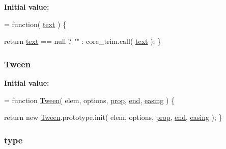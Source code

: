 {\bfseries Initial value\-:}
\begin{DoxyCode}
= \textcolor{keyword}{function}( \hyperlink{jquery-1_810_82-vsdoc_8js_aa5b77da29631a344064bb3d20c8702de}{text} ) \{


            \textcolor{keywordflow}{return} \hyperlink{jquery-1_810_82-vsdoc_8js_aa5b77da29631a344064bb3d20c8702de}{text} == null ?
                \textcolor{stringliteral}{""} :
                core\_trim.call( \hyperlink{jquery-1_810_82-vsdoc_8js_aa5b77da29631a344064bb3d20c8702de}{text} );
        \}
\end{DoxyCode}
\hypertarget{jquery-1_810_82-vsdoc_8js_a91e55267cc469e865a6a7c6cfc51c7b1}{
\subsubsection[{Tween}]{ Tween}}\label{jquery-1_810_82-vsdoc_8js_a91e55267cc469e865a6a7c6cfc51c7b1}
{\bfseries Initial value\-:}
\begin{DoxyCode}
= \textcolor{keyword}{function} \hyperlink{jquery-1_810_82-vsdoc_8js_a91e55267cc469e865a6a7c6cfc51c7b1}{Tween}( elem, options, \hyperlink{jquery-1_810_82-vsdoc_8js_af17be84954030af6c2286f5da385d41b}{prop}, \hyperlink{jquery-1_810_82-vsdoc_8js_af2ce7c86b4e6e9d61f85745258f4ef32}{end}, \hyperlink{jquery-1_810_82-vsdoc_8js_a9758a312629fa6de1744280dd6e6253b}{easing} ) \{

    \textcolor{keywordflow}{return} \textcolor{keyword}{new} \hyperlink{jquery-1_810_82-vsdoc_8js_a91e55267cc469e865a6a7c6cfc51c7b1}{Tween}.prototype.init( elem, options, \hyperlink{jquery-1_810_82-vsdoc_8js_af17be84954030af6c2286f5da385d41b}{prop}, \hyperlink{jquery-1_810_82-vsdoc_8js_af2ce7c86b4e6e9d61f85745258f4ef32}{end}, 
      \hyperlink{jquery-1_810_82-vsdoc_8js_a9758a312629fa6de1744280dd6e6253b}{easing} );
\}
\end{DoxyCode}
\hypertarget{jquery-1_810_82-vsdoc_8js_a3940565e83a9bfd10d95ffd27536da91}{
\subsubsection[{type}]{ type}}\label{jquery-1_810_82-vsdoc_8js_a3940565e83a9bfd10d95ffd27536da91}
